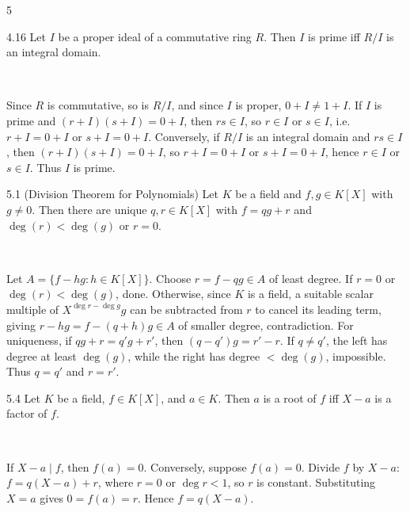 \documentclass[8pt]{extarticle}
\makeatletter
\renewenvironment{proof}[1][\proofname]{%
  \par\noindent
  \pushQED{\qed}%
  \normalfont\itshape #1\@addpunct{.}\ \normalfont\ignorespaces
}{%
  \popQED%
  \par
}
\makeatother
\begin{document}
\begin{multicols}{5}
        \begin{theorem}{4.16}
            Let \(I\) be a proper ideal of a commutative ring \(R\). Then \(I\) is prime iff \(R/I\) is an integral domain.
        \end{theorem}

        \begin{proof}
            Since \(R\) is commutative, so is \(R/I\), and since \(I\) is proper, \(0+I\ne1+I\). If \(I\) is prime and \((r+I)(s+I)=0+I\), then \(rs\in I\), so \(r\in I\) or \(s\in I\), i.e. \(r+I=0+I\) or \(s+I=0+I\). Conversely, if \(R/I\) is an integral domain and \(rs\in I\), then \((r+I)(s+I)=0+I\), so \(r+I=0+I\) or \(s+I=0+I\), hence \(r\in I\) or \(s\in I\). Thus \(I\) is prime.
        \end{proof}

        \begin{theorem}{5.1}
            (Division Theorem for Polynomials) Let \(K\) be a field and \(f,g\in K[X]\) with \(g\ne0\). Then there are unique \(q,r\in K[X]\) with \(f=qg+r\) and \(\deg(r)<\deg(g)\) or \(r=0\).
        \end{theorem}

        \begin{proof}
            Let \(A=\{f-hg:h\in K[X]\}\). Choose \(r=f-qg\in A\) of least degree. If \(r=0\) or \(\deg(r)<\deg(g)\), done. Otherwise, since \(K\) is a field, a suitable scalar multiple of \(X^{\deg r-\deg g}g\) can be subtracted from \(r\) to cancel its leading term, giving \(r-hg=f-(q+h)g\in A\) of smaller degree, contradiction. For uniqueness, if \(qg+r=q'g+r'\), then \((q-q')g=r'-r\). If \(q\ne q'\), the left has degree at least \(\deg(g)\), while the right has degree \(<\deg(g)\), impossible. Thus \(q=q'\) and \(r=r'\).
        \end{proof}

        \begin{corollary}{5.4}
            Let \(K\) be a field, \(f\in K[X]\), and \(a\in K\). Then \(a\) is a root of \(f\) iff \(X-a\) is a factor of \(f\).
        \end{corollary}

        \begin{proof}
            If \(X-a\mid f\), then \(f(a)=0\). Conversely, suppose \(f(a)=0\). Divide \(f\) by \(X-a\): \(f=q(X-a)+r\), where \(r=0\) or \(\deg r<1\), so \(r\) is constant. Substituting \(X=a\) gives \(0=f(a)=r\). Hence \(f=q(X-a)\).
        \end{proof}


\end{multicols}
\end{document}
